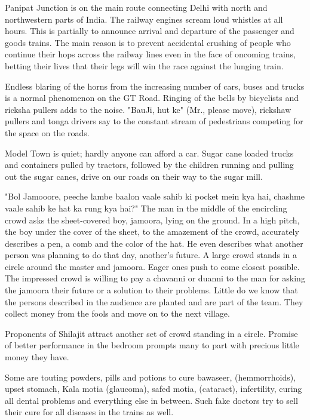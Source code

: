 Panipat Junction is on the main route connecting Delhi with north and
northwestern parts of India. The railway engines scream loud whistles at
all hours. This is partially to announce arrival and departure of the
passenger and goods trains. The main reason is to prevent accidental
crushing of people who continue their hops across the railway lines even
in the face of oncoming trains, betting their lives that their legs will
win the race against the lunging train. 

Endless blaring of the horns from the increasing number of cars, buses and
trucks is a normal phenomenon on the GT Road. Ringing of the bells by
bicyclists and ricksha pullers adds to the noise. "BauJi, hut ke" (Mr.,
please move), rickshaw pullers and tonga drivers say to the constant
stream of pedestrians competing for the space on the roads. 

Model Town is quiet; hardly anyone can afford a car. Sugar cane loaded
trucks and containers pulled by tractors, followed by the children running
and pulling out the sugar canes, drive on our roads on their way to the
sugar mill. 

"Bol Jamooore, peeche lambe baalon vaale sahib ki pocket mein kya hai,
chashme vaale sahib ke hat ka rung kya hai?" The man in the middle of the
encircling crowd asks the sheet-covered boy, jamoora, lying on the ground.
In a high pitch, the boy under the cover of the sheet, to the amazement of
the crowd, accurately describes a pen, a comb and the color of the hat. He
even describes what another person was planning to do that day, another's
future. A large crowd stands in a circle around the master and jamoora.
Eager ones push to come closest possible. The impressed crowd is willing
to pay a chavanni or duanni to the man for asking the jamoora their future
or a solution to their problems. Little do we know that the persons
described in the audience are planted and are part of the team. They
collect money from the fools and move on to the next village. 

Proponents of Shilajit attract another set of crowd standing in a circle.
Promise of better performance in the bedroom prompts many to part with
precious little money they have. 

Some are touting powders, pills and potions to cure bawaseer,
(hemmorrhoids), upset stomach, Kala motia (glaucoma), safed motia,
(cataract), infertility, curing all dental problems and everything else in
between. Such fake doctors try to sell their cure for all diseases in the
trains as well. 

